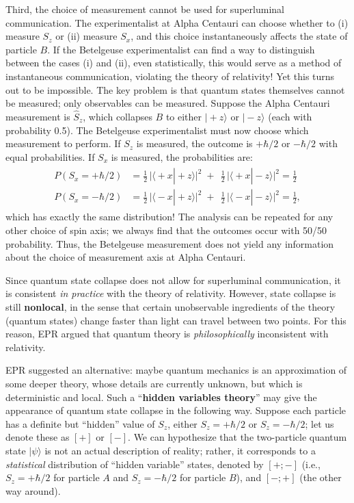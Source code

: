 \documentclass[pra,12pt]{revtex4}
\begin{document}
Third, the choice of measurement cannot be used for superluminal
communication.  The experimentalist at Alpha Centauri can choose
whether to (i) measure $S_z$ or (ii) measure $S_x$, and this choice
instantaneously affects the state of particle $B$.  If the Betelgeuse
experimentalist can find a way to distinguish between the cases (i)
and (ii), even statistically, this would serve as a method of
instantaneous communication, violating the theory of relativity!  Yet
this turns out to be impossible.  The key problem is that quantum
states themselves cannot be measured; only observables can be
measured.  Suppose the Alpha Centauri measurement is $\hat{S}_z$,
which collapses $B$ to either $|\!+\!z\rangle$ or $|\!-\!z\rangle$
(each with probability 0.5).  The Betelgeuse experimentalist must now
choose which measurement to perform.  If $S_z$ is measured, the
outcome is $+\hbar/2$ or $-\hbar/2$ with equal probabilities.  If
$S_x$ is measured, the probabilities are:
\begin{align}
  \begin{aligned}P(S_x = +\hbar/2) &= \frac{1}{2}\, \Big|\langle\!+x|\!+\!z\rangle\Big|^2 \;+\;\, \frac{1}{2}\, \Big|\langle\!+x|\!-\!z\rangle\Big|^2 = \frac{1}{2}\\P(S_x = -\hbar/2) &= \frac{1}{2}\, \Big|\langle\!-x|\!+\!z\rangle\Big|^2 \;+\;\, \frac{1}{2}\, \Big|\langle\!-x|\!-\!z\rangle\Big|^2 = \frac{1}{2},\end{aligned}
\end{align}
which has exactly the same distribution!  The analysis can be repeated
for any other choice of spin axis; we always find that the outcomes
occur with 50/50 probability.  Thus, the Betelgeuse measurement does
not yield any information about the choice of measurement axis at
Alpha Centauri.

Since quantum state collapse does not allow for superluminal
communication, it is consistent \textit{in practice} with the theory
of relativity.  However, state collapse is still \textbf{nonlocal}, in
the sense that certain unobservable ingredients of the theory (quantum
states) change faster than light can travel between two points.  For
this reason, EPR argued that quantum theory is
\textit{philosophically} inconsistent with relativity.

EPR suggested an alternative: maybe quantum mechanics is an
approximation of some deeper theory, whose details are currently
unknown, but which is deterministic and local.  Such a
``\textbf{hidden variables theory}'' may give the appearance of
quantum state collapse in the following way.  Suppose each particle
has a definite but ``hidden'' value of $S_z$, either $S_z = +\hbar/2$
or $S_z = -\hbar/2$; let us denote these as $[+]$ or $[-]$.  We can
hypothesize that the two-particle quantum state $|\psi\rangle$ is not
an actual description of reality; rather, it corresponds to a
\textit{statistical} distribution of ``hidden variable'' states,
denoted by $[+;-]$ (i.e., $S_z = +\hbar/2$ for particle $A$ and $S_z =
-\hbar/2$ for particle $B$), and $[-;+]$ (the other way around).
\end{document}
